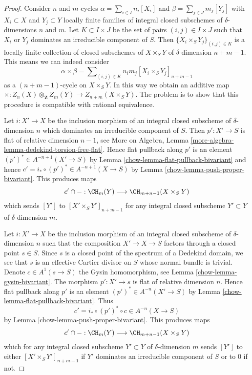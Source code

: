 \begin{proof}

Consider $n$ and $m$ cycles $\alpha = \sum_{i \in I} n_i[X_i]$
and $\beta = \sum_{j \in J} m_j[Y_j]$ with $X_i \subset X$ and $Y_j \subset Y$
locally finite families of integral closed subschemes of
$\delta$-dimensions $n$ and $m$. Let $K \subset I \times J$ be the set
of pairs $(i, j) \in I \times J$ such that $X_i$ or $Y_j$ dominates
an irreducible component of $S$.
Then $\{X_i \times_S Y_j\}_{(i, j) \in K}$ is a locally finite
collection of closed subschemes of $X \times_S Y$ of
$\delta$-dimension $n + m - 1$. This means we can indeed consider
$$
\alpha \times \beta =
\sum\nolimits_{(i, j) \in K} n_i m_j [X_i \times_S Y_j]_{n + m - 1}
$$
as a $(n + m - 1)$-cycle on $X \times_S Y$. In this way we obtain an
additive map
$\times : Z_n(X) \otimes_{\mathbf{Z}} Z_m(Y) \to Z_{n + m}(X \times_S Y)$.
The problem is to show that
this procedure is compatible with rational equivalence.

\medskip\noindent
Let $i : X' \to X$ be the inclusion morphism of an integral closed subscheme
of $\delta$-dimension $n$ which dominates an irreducible component
of $S$. Then $p' : X' \to S$ is flat of relative dimension $n - 1$, see
More on Algebra, Lemma \ref{more-algebra-lemma-dedekind-torsion-free-flat}.
Hence flat pullback along $p'$ is an element
$(p')^* \in A^{-n + 1}(X' \to S)$ by
Lemma \ref{chow-lemma-flat-pullback-bivariant}
and hence $c' = i_* \circ (p')^* \in A^{-n + 1}(X \to S)$ by
Lemma \ref{chow-lemma-push-proper-bivariant}.
This produces maps
$$
c' \cap - : \CH_m(Y) \longrightarrow \CH_{m + n - 1}(X \times_S Y)
$$
which sends $[Y']$ to $[X' \times_S Y']_{n + m - 1}$ for any
integral closed subscheme $Y' \subset Y$ of $\delta$-dimension $m$.

\medskip\noindent
Let $i : X' \to X$ be the inclusion morphism of an integral closed subscheme
of $\delta$-dimension $n$ such that the composition $X' \to X \to S$
factors through a closed point $s \in S$. Since $s$ is a closed point
of the spectrum of a Dedekind domain, we see that $s$ is an effective
Cartier divisor on $S$ whose normal bundle is trivial. Denote
$c \in A^1(s \to S)$ the Gysin homomorphism, see
Lemma \ref{chow-lemma-gysin-bivariant}. The morphism $p' : X' \to s$
is flat of relative dimension $n$. Hence flat pullback along $p'$
is an element $(p')^* \in A^{-n}(X' \to S)$ by
Lemma \ref{chow-lemma-flat-pullback-bivariant}.
Thus
$$
c' = i_* \circ (p')^* \circ c \in A^{-n}(X \to S)
$$
by Lemma \ref{chow-lemma-push-proper-bivariant}. This produces maps
$$
c' \cap - : \CH_m(Y) \longrightarrow \CH_{m + n - 1}(X \times_S Y)
$$
which for any integral closed subscheme $Y' \subset Y$
of $\delta$-dimension $m$
sends $[Y']$ to either $[X' \times_S Y']_{n + m - 1}$ if $Y'$ dominates
an irreducible component of $S$ or to $0$ if not.


\end{proof}

